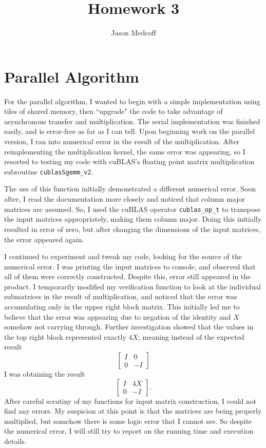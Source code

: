 \documentclass{amsart}
\title{Homework 3}
\author{Jason Medcoff}
\date{}
\begin{document}
	\maketitle
	
	\section{Parallel Algorithm}
	For the parallel algorithm, I wanted to begin with a simple implementation using tiles of shared memory, then ``upgrade" the code to take advantage of asynchronous transfer and multiplication. The serial implementation was finished easily, and is error-free as far as I can tell. Upon beginning work on the parallel version, I ran into numerical error in the result of the multiplication. After reimplementing the multiplication kernel, the same error was appearing, so I resorted to testing my code with cuBLAS's floating point matrix multiplication subroutine \texttt{cublasSgemm\_v2}. 
	
	The use of this function initially demonstrated a different numerical error. Soon after, I read the documentation more closely and noticed that column major matrices are assumed. So, I used the cuBLAS operator \texttt{cublas\_op\_t} to transpose the input matrices appropriately, making them column major. Doing this initially resulted in error of zero, but after changing the dimensions of the input matrices, the error appeared again.
	
	I continued to experiment and tweak my code, looking for the source of the numerical error. I was printing the input matrices to console, and observed that all of them were correctly constructed. Despite this, error still appeared in the product. I temporarily  modified my verification function to look at the individual submatrices in the result of multiplication, and noticed that the error was accumulating only in the upper right block matrix. This initially led me to believe that the error was appearing due to negation of the identity and $X$ somehow not carrying through. Further investigation showed that the values in the top right block represented exactly $4X$; meaning instead of the expected result
	$$ \begin{bmatrix}
	I & 0 \\
	0 & -I
	\end{bmatrix}$$
	I was obtaining the result
	$$ \begin{bmatrix}
	I & 4X \\
	0 & -I
	\end{bmatrix} .$$
	After careful scrutiny of my functions for input matrix construction, I could not find any errors. My suspicion at this point is that the matrices are being properly multiplied, but somehow there is some logic error that I cannot see. So despite the numerical error, I will still try to report on the running time and execution details.
	
\end{document}
